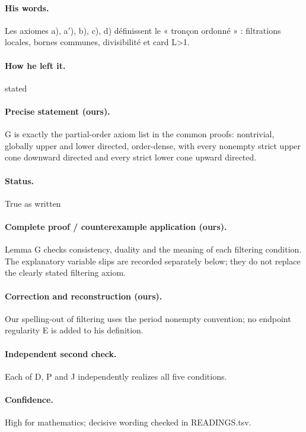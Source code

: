 \paragraph{His words.} Les axiomes a), a\ensuremath{\prime}), b), c), d) définissent le « tronçon ordonné » : filtrations locales, bornes communes, divisibilité et card L>1.

\paragraph{How he left it.} stated

\paragraph{Precise statement (ours).} G is exactly the partial-order axiom list in the common proofs: nontrivial, globally upper and lower directed, order-dense, with every nonempty strict upper cone downward directed and every strict lower cone upward directed.

\paragraph{Status.} True as written

\paragraph{Complete proof / counterexample application (ours).} Lemma G checks consistency, duality and the meaning of each filtering condition. The explanatory variable slips are recorded separately below; they do not replace the clearly stated filtering axiom.

\paragraph{Correction and reconstruction (ours).} Our spelling-out of filtering uses the period nonempty convention; no endpoint regularity E is added to his definition.

\paragraph{Independent second check.} Each of D, P and J independently realizes all five conditions.

\paragraph{Confidence.} High for mathematics; decisive wording checked in READINGS.tsv.

